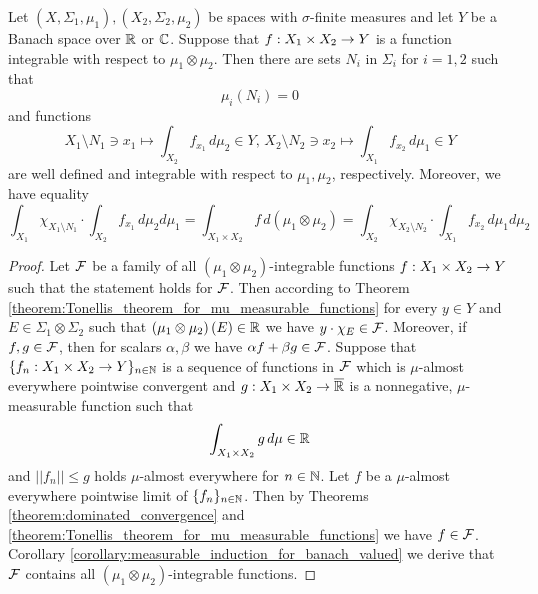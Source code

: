 \begin{theorem}\label{corollary:fubinis_for_integrable}
Let $(X,\Sigma_1,\mu_1), (X_2,\Sigma_2,\mu_2)$ be spaces with $\sigma$-finite measures and let $Y$ be a Banach space over ${\mathbb R}$ or ${\mathbb C}$. Suppose that $f:X_1\times X_2\rightarrow Y$ is a function integrable with respect to $\mu_1\otimes \mu_2$. Then there are sets $N_i$ in $\Sigma_i$ for $i=1,2$ such that
$$\mu_i(N_i) = 0$$ 
and functions
$$X_1\setminus N_1\ni x_1\mapsto \int_{X_2}f_{x_1}\,d\mu_2\in Y,\,X_2\setminus N_2\ni x_2\mapsto \int_{X_1}f_{x_2}\,d\mu_1\in Y$$
are well defined and integrable with respect to $\mu_1, \mu_2$, respectively. Moreover, we have equality
$$\int_{X_1}\chi_{X_1\setminus N_1}\cdot \int_{X_2} f_{x_1}\,d\mu_2d\mu_1 = \int_{X_1\times X_2}f\,d(\mu_1\otimes \mu_2) = \int_{X_2}\chi_{X_2\setminus N_2}\cdot\int_{X_1} f_{x_2}\,d\mu_1d\mu_2$$
\end{theorem}
\begin{proof}
Let ${\mathcal F}$ be a family of all $\left(\mu_1\otimes \mu_2\right)$-integrable functions $f:X_1\times X_2\rightarrow Y$ such that the statement holds for ${\mathcal F}$. Then according to Theorem \ref{theorem:Tonellis_theorem_for_mu_measurable_functions} for every $y\in Y$ and $E\in \Sigma_1\otimes \Sigma_2$ such that $\left(\mu_1\otimes \mu_2\right)(E) \in {\mathbb R}$ we have $y\cdot \chi_E \in {\mathcal F}$. Moreover, if $f, g\in {\mathcal F}$, then for scalars $\alpha,\beta$ we have $\alpha f + \beta g\in {\mathcal F}$. Suppose that $\{f_n:X_1\times X_2\rightarrow Y\}_{n\in {\mathbb N}}$ is a sequence of functions in ${\mathcal F}$ which is $\mu$-almost everywhere pointwise convergent and $g:X_1\times X_2\rightarrow \overline{{\mathbb R}}$ is a nonnegative, $\mu$-measurable function such that
$$\int_{X_1\times X_2}g\,d\mu \in {\mathbb R}$$
and $||f_n||\leq g$ holds $\mu$-almost everywhere for $n\in {\mathbb N}$. Let $f$ be a $\mu$-almost everywhere pointwise limit of $\{f_n\}_{n\in {\mathbb N}}$. Then by Theorems \ref{theorem:dominated_convergence} and \ref{theorem:Tonellis_theorem_for_mu_measurable_functions} we have $f\in {\mathcal F}$. Corollary \ref{corollary:measurable_induction_for_banach_valued} we derive that ${\mathcal F}$ contains all $\left(\mu_1\otimes \mu_2\right)$-integrable functions.
\end{proof}




\small



